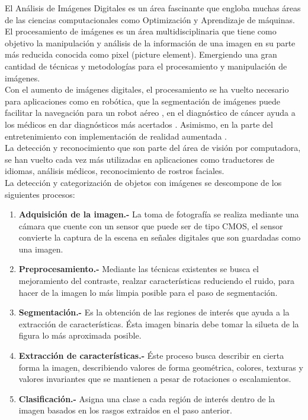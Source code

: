 \documentclass[a4paper, 11pt]{article}
\begin{document}
El Análisis de Imágenes Digitales es un área fascinante que engloba muchas áreas de las ciencias computacionales como Optimización y Aprendizaje de máquinas.\\

El procesamiento de imágenes es un área multidisciplinaria que tiene como objetivo la manipulación y análisis de la información de una imagen en su parte más reducida conocida como pixel (picture element). Emergiendo una gran cantidad de técnicas y metodologías para el procesamiento y manipulación de imágenes.\\

Con el aumento de imágenes digitales, el procesamiento se ha vuelto necesario para aplicaciones como en robótica, que la segmentación de imágenes puede facilitar la navegación para un robot aéreo \cite{smolyanskiy2017lowflying}, en el diagnóstico de cáncer ayuda a los médicos en dar diagnósticos más acertados \cite{10059977}. Asimismo, en la parte del entretenimiento con implementación de realidad aumentada \cite{8776989} .\\

La detección y reconocimiento que son parte del área de visión por computadora, se han vuelto cada vez más utilizadas en aplicaciones como traductores de idiomas, análisis médicos, reconocimiento de rostros faciales.\\

La detección y categorización de objetos con imágenes se descompone de los siguientes procesos:

\begin{enumerate}
\item \textbf{Adquisición de la imagen.-} La toma de fotografía se realiza mediante una cámara  que cuente con un sensor que puede ser de tipo CMOS, el sensor convierte la captura de la escena en señales digitales que son guardadas como una imagen.
\item \textbf{Preprocesamiento.-} Mediante las técnicas existentes se busca el mejoramiento del contraste, realzar características reduciendo el ruido, para hacer de la imagen lo más limpia posible para el paso de segmentación. 
\item \textbf{Segmentación.-} Es la obtención de las regiones de interés que ayuda a la extracción de características. Ésta imagen binaria debe tomar la silueta de la figura lo más aproximada posible.
\item \textbf{Extracción de características.-} Éste proceso busca describir en cierta forma la imagen, describiendo valores de forma geométrica, colores, texturas y valores invariantes que se mantienen a pesar de rotaciones o escalamientos.
\item \textbf{Clasificación.-} Asigna una clase a cada región de interés dentro de la imagen basados en los rasgos extraidos en el paso anterior.
\end{enumerate}
\end{document}
